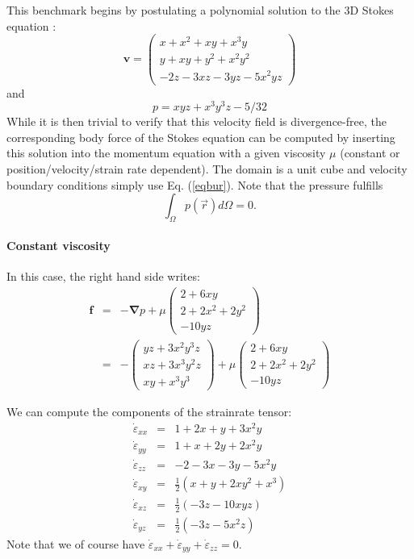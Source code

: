 This benchmark begins by postulating a polynomial solution 
to the 3D Stokes equation \cite{dobo04}:
\begin{equation}
{\bm v}
=
\left(
\begin{array}{c}
x+x^2+xy+x^3y \\
y + xy + y^2 + x^2 y^2\\
-2z - 3xz - 3yz - 5x^2 yz
\end{array}
\right)
\label{eqbur}
\end{equation}
and
\begin{equation}
p = xyz + x^3 y^3z - 5/32
\end{equation}
While it is then trivial to verify that this velocity field is divergence-free,  
the corresponding body force of the Stokes equation can be computed by  
inserting this solution into the momentum equation with a given viscosity $\mu$
(constant or position/velocity/strain rate dependent). 
The domain is a unit cube and velocity boundary conditions 
simply use Eq. (\ref{eqbur}). 
Note that the pressure fulfills 
\[
\int_\Omega p({\vec r}) d\Omega = 0.  
\]


\paragraph{Constant viscosity}
In this case, the right hand side writes:
\begin{eqnarray}
{\bm f} &=& 
-{\bm \nabla p} + 
\mu
\left(
\begin{array}{c}
2+6xy \\
2+2x^2+2y^2 \\
-10yz
\end{array}
\right) \nonumber\\
&=&
-
\left(
\begin{array}{c}
yz+3x^2 y^3z \\
xz+3 x^3 y^2 z \\
xy+x^3y^3
\end{array}
\right) 
+
\mu
\left(
\begin{array}{c}
2+6xy \\
2+2x^2+2y^2 \\
-10yz
\end{array}
\right)
\nonumber
\end{eqnarray}

We can compute the components of the strainrate tensor:
\begin{eqnarray}
\dot{\varepsilon}_{xx} &=& 1+2x+y+3x^2y\\
\dot{\varepsilon}_{yy} &=& 1+x+2y+2x^2y\\
\dot{\varepsilon}_{zz} &=& -2-3x-3y-5x^2y\\ 
\dot{\varepsilon}_{xy} &=&  \frac{1}{2} (x+y+2xy^2+x^3)\\
\dot{\varepsilon}_{xz} &=&  \frac{1}{2} (-3z-10xyz  )\\
\dot{\varepsilon}_{yz} &=&  \frac{1}{2} ( -3z -5x^2z )
\end{eqnarray}
Note that we of course have $\dot{\varepsilon}_{xx} +\dot{\varepsilon}_{yy} 
+\dot{\varepsilon}_{zz} =0$.

